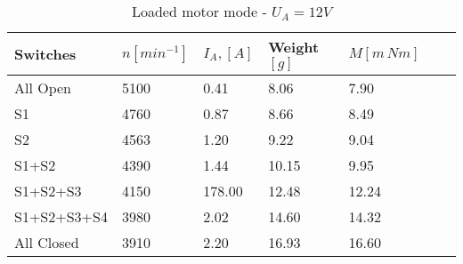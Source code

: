 \begin{table}[htbp]
   \centering
   \begin{tabularx}{\columnwidth}{XXXXXXX}
      \toprule
      Switches    & $n [min^{-1}]$ & $I_A ,[A]$ & Weight $[g]$ & $M [m\,Nm]$ \\
      \midrule
      All Open    & 5100           & 0.41       & 8.06         & 7.90        \\
      S1          & 4760           & 0.87       & 8.66         & 8.49        \\
      S2          & 4563           & 1.20       & 9.22         & 9.04        \\
      S1+S2       & 4390           & 1.44       & 10.15        & 9.95        \\
      S1+S2+S3    & 4150           & 178.00     & 12.48        & 12.24       \\
      S1+S2+S3+S4 & 3980           & 2.02       & 14.60        & 14.32       \\
      All Closed  & 3910           & 2.20       & 16.93        & 16.60       \\
      \bottomrule
   \end{tabularx}
   \caption{Loaded motor mode - $U_A=12V$}
\end{table}
